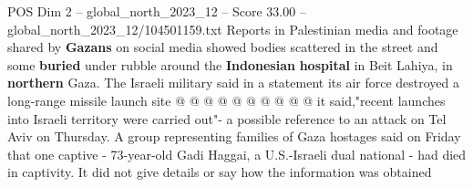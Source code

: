 \begin{textsample}{POS Dim 2 – global\_north\_2023\_12 – Score 33.00 – global\_north\_2023\_12/104501159.txt}
Reports in Palestinian media and footage shared by \textbf{Gazans} on social media showed bodies scattered in the street and some \textbf{buried} under rubble around the \textbf{Indonesian} \textbf{hospital} in Beit Lahiya, in \textbf{northern} Gaza.
The Israeli military said in a statement its air force destroyed a long-range missile launch site @ @ @ @ @ @ @ @ @ @ it said,"recent launches into Israeli territory were carried out"- a possible reference to an attack on Tel Aviv on Thursday.
A group representing families of Gaza hostages said on Friday that one captive - 73-year-old Gadi Haggai, a U.S.-Israeli dual national - had died in captivity.
It did not give details or say how the information was obtained

\end{textsample}
